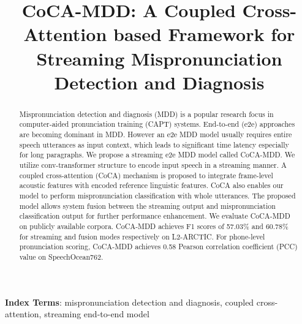 \documentclass[a4paper]{article}
\title{CoCA-MDD: A Coupled Cross-Attention based Framework for Streaming Mispronunciation Detection and Diagnosis}
\begin{document}
\ninept
%
\maketitle
%
\begin{abstract}
Mispronunciation detection and diagnosis (MDD) is a popular research focus in computer-aided pronunciation training (CAPT) systems. End-to-end (e2e) approaches are becoming dominant in MDD. 
However an e2e MDD model usually requires entire speech utterances as input context, which leads to significant time latency especially for long paragraphs. 
We propose a streaming e2e MDD model called CoCA-MDD. We utilize conv-transformer structure to encode input speech in a streaming manner. A coupled cross-attention (CoCA) mechanism is proposed to integrate frame-level acoustic features with encoded reference linguistic features. CoCA also enables our model to perform mispronunciation classification with whole utterances. 
The proposed model allows system fusion between the streaming output and mispronunciation classification output for further performance enhancement. 
We evaluate CoCA-MDD on publicly available corpora. CoCA-MDD achieves F1 scores of 57.03\% and 60.78\% for streaming and fusion modes respectively on L2-ARCTIC. For phone-level pronunciation scoring,  CoCA-MDD achieves 0.58 Pearson correlation coefficient (PCC) value  on SpeechOcean762.




\end{abstract}
\noindent\textbf{Index Terms}: mispronunciation detection and diagnosis, coupled cross-attention, streaming end-to-end model
%
\end{document}
